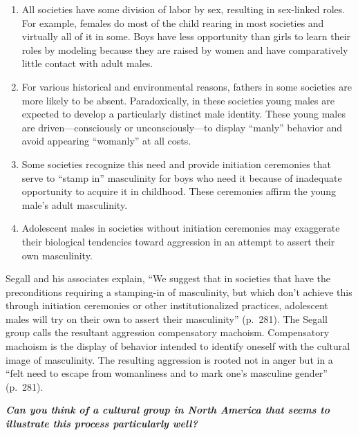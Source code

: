 \documentclass[
]{book}
\providecommand{\tightlist}{%
  \setlength{\itemsep}{0pt}\setlength{\parskip}{0pt}}
\begin{document}
\begin{enumerate}
\def\labelenumi{\arabic{enumi}.}
\tightlist
\item
  All societies have some division of labor by sex, resulting in sex-linked roles. For example, females do most of the child rearing in most societies and virtually all of it in some. Boys have less opportunity than girls to learn their roles by modeling because they are raised by women and have comparatively little contact with adult males.\\
\item
  For various historical and environmental reasons, fathers in some societies are more likely to be absent. Paradoxically, in these societies young males are expected to develop a particularly distinct male identity. These young males are driven---consciously or unconsciously---to display ``manly'' behavior and avoid appearing ``womanly'' at all costs.\\
\item
  Some societies recognize this need and provide initiation ceremonies that serve to ``stamp in'' masculinity for boys who need it because of inadequate opportunity to acquire it in childhood. These ceremonies affirm the young male's adult masculinity.\\
\item
  Adolescent males in societies without initiation ceremonies may exaggerate their biological tendencies toward aggression in an attempt to assert their own masculinity.
\end{enumerate}

Segall and his associates explain, ``We suggest that in societies that have the preconditions requiring a stamping-in of masculinity, but which don't achieve this through initiation ceremonies or other institutionalized practices, adolescent males will try on their own to assert their masculinity'' (p.~281). The Segall group calls the resultant aggression compensatory machoism. Compensatory machoism is the display of behavior intended to identify oneself with the cultural image of masculinity. The resulting aggression is rooted not in anger but in a ``felt need to escape from womanliness and to mark one's masculine gender'' (p.~281).

\textbf{\emph{Can you think of a cultural group in North America that seems to illustrate this process particularly well?}}
\end{document}
